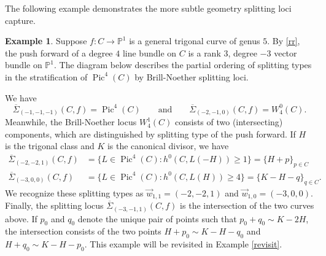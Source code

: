 \documentclass[12pt]{amsart}
\newcommand{\pp}{\mathbb{P}}
\DeclareMathOperator{\Pic}{Pic}
\newcommand{\Sigmabar}{\overline{\Sigma}}
\theoremstyle{definition}
\newtheorem{Example}[theorem]{Example}
\theoremstyle{remark}
\theoremstyle{remark}
\numberwithin{equation}{section}
\begin{document}
The following example demonstrates the more subtle geometry splitting loci capture.
\begin{Example} \label{Geoff}
Suppose $f\colon  C \rightarrow \pp^1$ is a general trigonal curve of genus $5$. 
By \eqref{rr}, the push forward of a degree $4$ line bundle on $C$ is a rank $3$, degree $-3$ vector bundle on $\pp^1$.
The diagram below describes the partial ordering of splitting types in the stratification of $\Pic^4(C)$ by Brill-Noether splitting loci.
\begin{center}
\hspace{.5in}
\end{center}
We have
\[\Sigmabar_{(-1, -1, -1)}(C, f) = \Pic^4(C) \qquad \text{and} \qquad \Sigmabar_{(-2, -1, 0)}(C, f) = W^0_4(C).\]
Meanwhile, the Brill-Noether locus $W^1_4(C)$ consists of two (intersecting) components, which are distinguished by splitting type of the push forward.
 If $H$ is the trigonal class and $K$ is the canonical divisor, we have
\begin{align*}
\Sigmabar_{(-2, -2, 1)}(C, f) &= \{L \in \Pic^4(C) : h^0(C, L(-H)) \geq 1\} = \{H + p\}_{p \in C} \\
\Sigmabar_{(-3, 0, 0)}(C, f) &=  \{L \in \Pic^4(C) : h^0(C, L(H))  \geq 4\} = \{K - H - q\}_{q \in C}.
\end{align*}
We recognize these splitting types as $\vec{w}_{1,1} = (-2, -2, 1)$ and $\vec{w}_{1,0} = (-3, 0, 0)$.
Finally, the splitting locus $\Sigmabar_{(-3, -1, 1)}(C, f)$ is the intersection of the two curves above. 
If $p_0$ and $q_0$ denote the unique pair of points such that $p_0 + q_0 \sim K - 2H$, 
the intersection consists of the two points $H + p_0 \sim K - H - q_0$ and $H + q_0 \sim K - H - p_0$. This example will be revisited in Example \ref{revisit}.
\end{Example}
\end{document}
